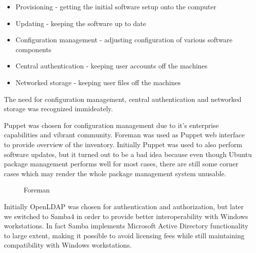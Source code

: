 \documentclass{article}
\begin{document}
\begin{itemize}
\item Provisioning - getting the initial software setup onto the computer
\item Updating - keeping the software up to date
\item Configuration management - adjusting configuration of various software components
\item Central authentication - keeping user accounts off the machines
\item Networked storage - keeping user files off the machines
\end{itemize}

The need for configuration management, central authentication
and networked storage was recognized immideately.


Puppet was chosen for configuration management due to it's
enterprise capabilities and vibrant community.
Foreman was used as Puppet web interface to provide
overview of the inventory.
Initially Puppet was used to also perform software updates, but
it turned out to be a bad idea because even though Ubuntu package
management performs well for most cases, there are still some
corner cases which may render the whole package management
system unusable.

\begin{figure}[!htb]
\centering
{}
\caption{Foreman}
\label{fig:foreman}
\end{figure}

Initially OpenLDAP was chosen for authentication and authorization,
but later we switched to Samba4 in order to provide better
interoperability with Windows workstations.
In fact Samba implements Microsoft Active Directory functionality
to large extent,
making it possible to avoid licensing fees while still maintaining
compatibility with Windows workstations.
\end{document}
